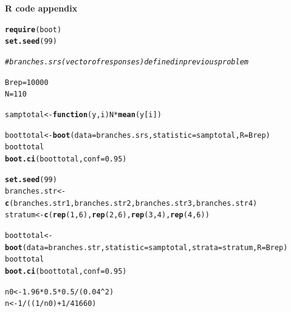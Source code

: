 \documentclass[12pt]{article}\usepackage[]{graphicx}\usepackage[]{color}
\makeatletter
\newcommand{\hlnum}[1]{\textcolor[rgb]{0.686,0.059,0.569}{#1}}%
\newcommand{\hlcom}[1]{\textcolor[rgb]{0.678,0.584,0.686}{\textit{#1}}}%
\newcommand{\hlopt}[1]{\textcolor[rgb]{0,0,0}{#1}}%
\newcommand{\hlstd}[1]{\textcolor[rgb]{0.345,0.345,0.345}{#1}}%
\newcommand{\hlkwa}[1]{\textcolor[rgb]{0.161,0.373,0.58}{\textbf{#1}}}%
\newcommand{\hlkwb}[1]{\textcolor[rgb]{0.69,0.353,0.396}{#1}}%
\newcommand{\hlkwc}[1]{\textcolor[rgb]{0.333,0.667,0.333}{#1}}%
\newcommand{\hlkwd}[1]{\textcolor[rgb]{0.737,0.353,0.396}{\textbf{#1}}}%
\newenvironment{kframe}{%
 \def\at@end@of@kframe{}%
 \ifinner\ifhmode%
  \def\at@end@of@kframe{\end{minipage}}%
  \begin{minipage}{\columnwidth}%
 \fi\fi%
 \def\FrameCommand##1{\hskip\@totalleftmargin \hskip-\fboxsep
 \colorbox{shadecolor}{##1}\hskip-\fboxsep
     \hskip-\linewidth \hskip-\@totalleftmargin \hskip\columnwidth}%
 \MakeFramed {\advance\hsize-\width
   \@totalleftmargin\z@ \linewidth\hsize
   \@setminipage}}%
 {\par\unskip\endMakeFramed%
 \at@end@of@kframe}
\newenvironment{knitrout}{}{} %
\makeatother
\begin{document}
{\bf \large R code appendix}

\begin{knitrout}\footnotesize
{}\color{fgcolor}\begin{kframe}
\begin{alltt}
\hlkwd{require}\hlstd{(boot)}
\hlkwd{set.seed}\hlstd{(}\hlnum{99}\hlstd{)}

\hlcom{#branches.srs (vector of responses) defined in previous problem}

\hlstd{Brep} \hlkwb{=} \hlnum{10000}
\hlstd{N}\hlkwb{=}\hlnum{110}

\hlstd{samptotal} \hlkwb{<-} \hlkwa{function}\hlstd{(}\hlkwc{y}\hlstd{,} \hlkwc{i}\hlstd{) N}\hlopt{*}\hlkwd{mean}\hlstd{(y[i])}

\hlstd{boottotal} \hlkwb{<-} \hlkwd{boot}\hlstd{(}\hlkwc{data}\hlstd{=branches.srs,} \hlkwc{statistic}\hlstd{=samptotal,} \hlkwc{R}\hlstd{=Brep)}
\hlstd{boottotal}
\hlkwd{boot.ci}\hlstd{(boottotal,} \hlkwc{conf}\hlstd{=}\hlnum{0.95}\hlstd{)}
\end{alltt}
\end{kframe}
\end{knitrout}

\begin{knitrout}\footnotesize
{}\color{fgcolor}\begin{kframe}
\begin{alltt}
\hlkwd{set.seed}\hlstd{(}\hlnum{99}\hlstd{)}
\hlstd{branches.str} \hlkwb{<-} \hlkwd{c}\hlstd{(branches.str1, branches.str2, branches.str3, branches.str4)}
\hlstd{stratum} \hlkwb{<-} \hlkwd{c}\hlstd{(}\hlkwd{rep}\hlstd{(}\hlnum{1}\hlstd{,} \hlnum{6}\hlstd{),} \hlkwd{rep}\hlstd{(}\hlnum{2}\hlstd{,} \hlnum{6}\hlstd{),} \hlkwd{rep}\hlstd{(}\hlnum{3}\hlstd{,} \hlnum{4}\hlstd{),} \hlkwd{rep}\hlstd{(}\hlnum{4}\hlstd{,} \hlnum{6}\hlstd{))}

\hlstd{boottotal} \hlkwb{<-} \hlkwd{boot}\hlstd{(}\hlkwc{data}\hlstd{=branches.str,} \hlkwc{statistic}\hlstd{=samptotal,} \hlkwc{strata}\hlstd{=stratum,} \hlkwc{R}\hlstd{=Brep)}
\hlstd{boottotal}
\hlkwd{boot.ci}\hlstd{(boottotal,} \hlkwc{conf}\hlstd{=}\hlnum{0.95}\hlstd{)}
\end{alltt}
\end{kframe}
\end{knitrout}

\begin{knitrout}\footnotesize
{}\color{fgcolor}\begin{kframe}
\begin{alltt}
\hlstd{n0} \hlkwb{<-} \hlnum{1.96}\hlopt{*}\hlnum{0.5}\hlopt{*}\hlnum{0.5}\hlopt{/}\hlstd{(}\hlnum{0.04}\hlopt{^}\hlnum{2}\hlstd{)}
\hlstd{n} \hlkwb{<-} \hlnum{1}\hlopt{/}\hlstd{((}\hlnum{1}\hlopt{/}\hlstd{n0)}\hlopt{+}\hlnum{1}\hlopt{/}\hlnum{41660}\hlstd{)}
\end{alltt}
\end{kframe}
\end{knitrout}
\end{document}
